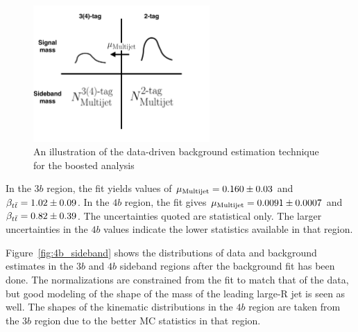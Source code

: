 \begin{figure}[h!]
  \centering
  \captionsetup{justification=centering}

  \includegraphics[width=0.6\textwidth]{figures/4b_bkg_cartoon}
  \caption{An illustration of the data-driven background estimation technique for the boosted analysis}
  \label{fig:4b_bkg_cartoon}
\end{figure}

In the $3b$ region, the fit yields values of $\mu_{\rm Multijet} = 0.160 \pm 0.03$ and $\beta_{t\bar{t}} = 1.02 \pm 0.09$. In the $4b$ region, the fit gives $\mu_{\rm Multijet} = 0.0091 \pm 0.0007$ and $\beta_{t\bar{t}} = 0.82 \pm 0.39$. The uncertainties quoted are statistical only. The larger uncertainties in the $4b$ values indicate the lower statistics available in that region. 

Figure~\ref{fig:4b_sideband} shows the distributions of data and background estimates in the $3b$ and $4b$ sideband regions after the background fit has been done. The normalizations are constrained from the fit to match that of the data, but good modeling of the shape of the mass of the leading large-R jet is seen as well. The shapes of the kinematic distributions in the $4b$ region are taken from the $3b$ region due to the better MC statistics in that region. 

